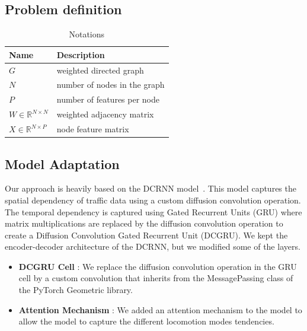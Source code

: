 \subsection{Problem definition}\label{subsec:problem-definition}


\begin{table}[htbp]
    \caption{Notations}
    \center
    \begin{tabular}{@{}ll@{}}
        \toprule
        \textbf{Name}                    & \textbf{Description}         \\
        \midrule
        $G$                              & weighted directed graph      \\
        $N$                              & number of nodes in the graph \\
        $P$                              & number of features per node  \\
        $W \in \mathbb{R}^{N \times N} $ & weighted adjacency matrix    \\
        $X \in \mathbb{R}^{N \times P} $ & node feature matrix          \\

        \bottomrule

    \end{tabular}
    \label{tab:notations}
\end{table}

\subsection{Model Adaptation}\label{subsec:model-adaptation}
Our approach is heavily based on the DCRNN model~\cite{DCRNN}.
This model captures the spatial dependency of traffic data using a custom diffusion convolution operation.
The temporal dependency is captured using Gated Recurrent Units (GRU) where matrix multiplications are replaced by
the diffusion convolution operation to create a Diffusion Convolution Gated Recurrent Unit (DCGRU).
We kept the encoder-decoder architecture of the DCRNN, but we modified some of the layers.

\begin{itemize}
    \item \textbf{DCGRU Cell} : We replace the diffusion convolution operation in the GRU cell by a custom convolution
    that inherits from the MessagePassing class of the PyTorch Geometric library.
    \item \textbf{Attention Mechanism} : We added an attention mechanism to the model to allow the model to capture
    the different locomotion modes tendencies.
\end{itemize}

